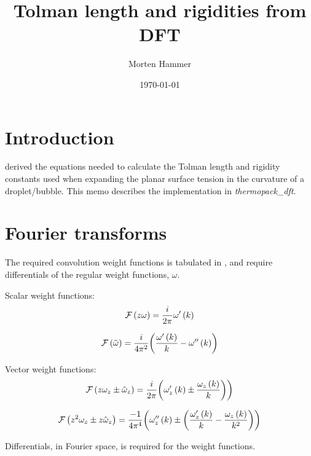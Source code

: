\documentclass[english]{dftmemo}
\title{Tolman length and rigidities from DFT}
\author{Morten Hammer}
\date{\today}
\newcommand*{\lb}{\ensuremath{\left(}}
\newcommand*{\rb}{\ensuremath{\right)}}
\begin{document}
\frontmatter

\section{Introduction}

\citet{rehner2019} derived the equations needed to calculate the
Tolman length and rigidity constants used when expanding the planar
surface tension in the curvature of a droplet/bubble. This memo
describes the implementation in \emph{thermopack\_dft}.


\section{Fourier transforms}
The required convolution weight functions is tabulated in
\cite[Tab. II]{rehner2019}, and require differentials of the regular
weight functions, $\omega$.

Scalar weight functions:
\begin{equation}
  \mathcal{F}\lb z \omega \rb = \frac{i}{2 \pi} \omega^\prime \lb k \rb
\end{equation}

\begin{equation}
  \mathcal{F}\lb \tilde{\omega} \rb = \frac{i}{4 \pi^2} \biggl( \frac{\omega^\prime \lb k \rb}{k} - \omega^{\prime\prime} \lb k \rb \biggr)
\end{equation}

Vector weight functions:
\begin{equation}
  \mathcal{F}\lb z \omega_z \pm \hat{\omega}_z \rb = \frac{i}{2 \pi} \biggl( \omega_z^\prime \lb k \rb \pm \frac{\omega_z \lb k \rb}{k} \biggr)\biggr)
\end{equation}

\begin{equation}
  \mathcal{F}\lb z^2 \omega_z \pm z\hat{\omega}_z \rb = \frac{-1}{4 \pi^4} \biggl( \omega_z^{\prime\prime} \lb k \rb \pm \biggl( \frac{\omega_z^\prime \lb k \rb}{k} - \frac{\omega_z \lb k \rb}{k^2}\biggr)\biggr)
\end{equation}

Differentials, in Fourier space, is required for the weight functions.
\end{document}
